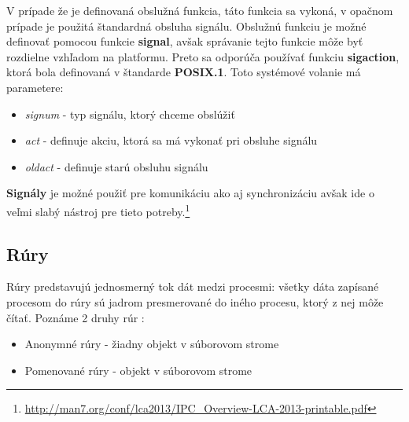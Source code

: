 V prípade že je definovaná obslužná funkcia, táto funkcia sa vykoná, v opačnom prípade je použitá štandardná obsluha signálu. Obslužnú funkciu je možné definovať pomocou funkcie \textbf{signal}, avšak správanie tejto funkcie môže byť rozdielne vzhľadom na platformu. Preto sa odporúča používať funkciu \textbf{sigaction}, ktorá bola definovaná v štandarde \textbf{POSIX.1}. Toto systémové volanie má parametere\cite{sigaction}:
\begin{itemize}
\item \textit{signum} - typ signálu, ktorý chceme obslúžiť
\item \textit{act} - definuje akciu, ktorá sa má vykonať pri obsluhe signálu
\item \textit{oldact} - definuje starú obsluhu signálu
\end{itemize}

\textbf{Signály} je možné použiť pre komunikáciu ako aj synchronizáciu avšak ide o veľmi slabý nástroj pre tieto potreby.\footnote{\url{http://man7.org/conf/lca2013/IPC_Overview-LCA-2013-printable.pdf}}
\subsection{Rúry}
Rúry predstavujú jednosmerný tok dát medzi procesmi: všetky dáta zapísané procesom do rúry sú jadrom   presmerované do iného procesu, ktorý z nej môže čítať. Poznáme 2 druhy rúr \cite{linux}:
\begin{itemize}
\item Anonymné rúry - žiadny objekt v súborovom strome
\item Pomenované rúry - objekt v súborovom strome
\end{itemize}
